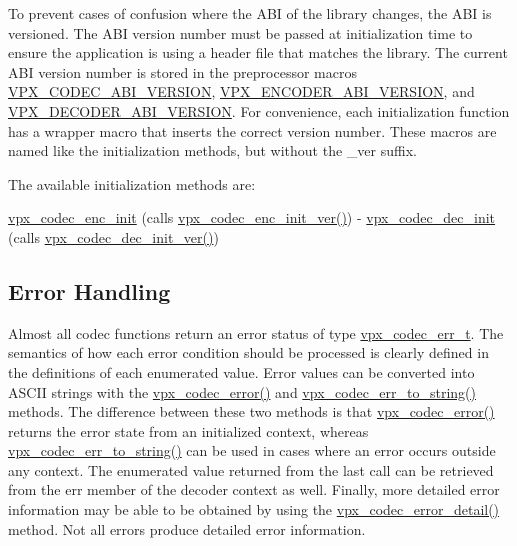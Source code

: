 \-To prevent cases of confusion where the \-A\-B\-I of the library changes, the \-A\-B\-I is versioned. \-The \-A\-B\-I version number must be passed at initialization time to ensure the application is using a header file that matches the library. \-The current \-A\-B\-I version number is stored in the preprocessor macros \hyperlink{group__codec_gaf7e9cad2df0f81679b881f46740ad097}{\-V\-P\-X\-\_\-\-C\-O\-D\-E\-C\-\_\-\-A\-B\-I\-\_\-\-V\-E\-R\-S\-I\-O\-N}, \hyperlink{group__encoder_gaa4f0b52293c08ba672429c3a03648b9d}{\-V\-P\-X\-\_\-\-E\-N\-C\-O\-D\-E\-R\-\_\-\-A\-B\-I\-\_\-\-V\-E\-R\-S\-I\-O\-N}, and \hyperlink{group__decoder_ga462b459e7ae13937e1eae1776245db12}{\-V\-P\-X\-\_\-\-D\-E\-C\-O\-D\-E\-R\-\_\-\-A\-B\-I\-\_\-\-V\-E\-R\-S\-I\-O\-N}. \-For convenience, each initialization function has a wrapper macro that inserts the correct version number. \-These macros are named like the initialization methods, but without the \-\_\-ver suffix.

\-The available initialization methods are\-:
\begin{DoxyItemize}
\item \hyperlink{group__encoder_ga3d490a2a9a6acd7c9ef82a603155f3cf}{vpx\-\_\-codec\-\_\-enc\-\_\-init} (calls \hyperlink{group__encoder_ga6ed21b96c481c0b6e1b543ef958a57a4}{vpx\-\_\-codec\-\_\-enc\-\_\-init\-\_\-ver()}) -\/ \hyperlink{group__decoder_ga8c2f0b12f1bd4927eb3c68b01eab19d3}{vpx\-\_\-codec\-\_\-dec\-\_\-init} (calls \hyperlink{group__decoder_ga26fe82cf8fd697f885935cea53be964f}{vpx\-\_\-codec\-\_\-dec\-\_\-init\-\_\-ver()})
\end{DoxyItemize}\hypertarget{usage_usage_errors}{}\subsection{\-Error Handling}\label{usage_usage_errors}
\-Almost all codec functions return an error status of type \hyperlink{group__codec_gada1084710837ad363b92f2379dd2b8d2}{vpx\-\_\-codec\-\_\-err\-\_\-t}. \-The semantics of how each error condition should be processed is clearly defined in the definitions of each enumerated value. \-Error values can be converted into \-A\-S\-C\-I\-I strings with the \hyperlink{group__codec_ga4d265df00d42b36a4f0e3eb83fc22c5e}{vpx\-\_\-codec\-\_\-error()} and \hyperlink{group__codec_gaaddf5c1f609ef18c7c8800d102fcefa6}{vpx\-\_\-codec\-\_\-err\-\_\-to\-\_\-string()} methods. \-The difference between these two methods is that \hyperlink{group__codec_ga4d265df00d42b36a4f0e3eb83fc22c5e}{vpx\-\_\-codec\-\_\-error()} returns the error state from an initialized context, whereas \hyperlink{group__codec_gaaddf5c1f609ef18c7c8800d102fcefa6}{vpx\-\_\-codec\-\_\-err\-\_\-to\-\_\-string()} can be used in cases where an error occurs outside any context. \-The enumerated value returned from the last call can be retrieved from the {\ttfamily err} member of the decoder context as well. \-Finally, more detailed error information may be able to be obtained by using the \hyperlink{group__codec_ga29273cb552ed1a437fe263c4a0a54300}{vpx\-\_\-codec\-\_\-error\-\_\-detail()} method. \-Not all errors produce detailed error information.

